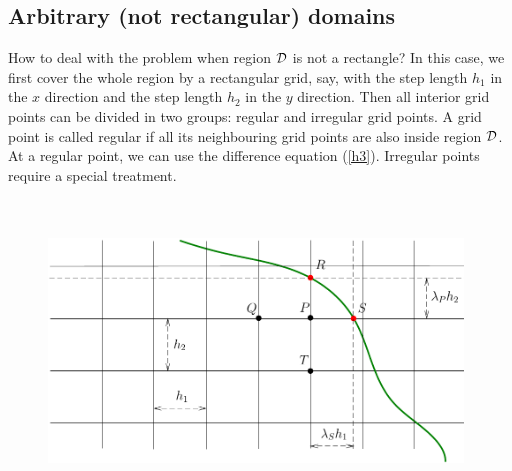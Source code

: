 
% 




\subsection{Arbitrary (not rectangular) domains}

How to deal with the problem when region
${\cal D}$ is not a rectangle? In this case, we first cover the
whole region by a rectangular grid, say, with the step length
$h_{1}$ in the $x$ direction and the step length $h_{2}$ in the
$y$ direction. Then all interior grid points can be divided in two
groups: regular and irregular grid points. A grid point is called
regular if all its neighbouring grid points are also inside region
${\cal D}$. At a regular point, we can use the difference equation
(\ref{h3}). Irregular points require a special treatment.

\begin{figure}[h]
\centering
\includegraphics[width=11cm,height=8cm]{curved_bound_new.pdf}
\caption{}
\end{figure}

